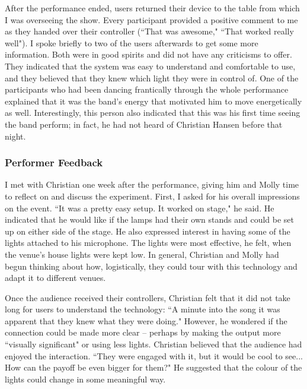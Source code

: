 After the performance ended, users returned their device to the table from which I was overseeing the show. Every participant provided a positive comment to me as they handed over their controller (``That was awesome," ``That worked really well"). I spoke briefly to two of the users afterwards to get some more information. Both were in good spirits and did not have any criticisms to offer. They indicated that the system was easy to understand and comfortable to use, and they believed that they knew which light they were in control of. One of the participants who had been dancing frantically through the whole performance explained that it was the band's energy that motivated him to move energetically as well. Interestingly, this person also indicated that this was his first time seeing the band perform; in fact, he had not heard of Christian Hansen before that night.

\subsubsection{Performer Feedback}

I met with Christian one week after the performance, giving him and Molly time to reflect on and discuss the experiment. First, I asked for his overall impressions on the event. ``It was a pretty easy setup. It worked on stage," he said. He indicated that he would like if the lamps had their own stands and could be set up on either side of the stage. He also expressed interest in having some of the lights attached to his microphone. The lights were most effective, he felt, when the venue's house lights were kept low. In general, Christian and Molly had begun thinking about how, logistically, they could tour with this technology and adapt it to different venues.

Once the audience received their controllers, Christian felt that it did not take long for users to understand the technology: ``A minute into the song it was apparent that they knew what they were doing." However, he wondered if the connection could be made more clear -- perhaps by making the output more ``visually significant" or using less lights. Christian believed that the audience had enjoyed the interaction. ``They were engaged with it, but it would be cool to see... How can the payoff be even bigger for them?" He suggested that the colour of the lights could change in some meaningful way.

